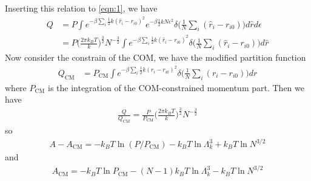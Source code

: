 \documentclass[aps,pre,a4paper,showkeys,fleqn]{revtex4}
\newcommand{\com}[0]{{\textrm{CM}}}
\begin{document}
Inserting this relation to \eqref{eqn:1}, we have
\begin{align}\nonumber
  Q
  & =
    P \int e^{-\beta\sum_i \frac 12k(\hat r_i - r_{i0})^2} e^{-\beta \frac12 kN \epsilon^2} \delta\big( \frac1N \sum_i (\hat r_i - r_{i0}) \big) d\hat r d\epsilon \\
  &=
    P \Big( \frac{2\pi k_BT}k  \Big)^{\frac32} N^{-\frac32}
    \int e^{-\beta\sum_i \frac 12k(\hat r_i - r_{i0})^2} \delta\big( \frac1N \sum_i (\hat r_i - r_{i0}) \big) d\hat r
\end{align}
Now consider the constrain of the COM, we have the modified partition function
\begin{align*}
  Q_\com
  &= 
    {P_\com}
    \int e^{-\beta\sum_i \frac 12k(r_i - r_{i0})^2} \delta\big(\frac1N\sum_i (r_i -  r_{i0})\big) dr 
\end{align*}
where $P_\com$ is the integration of the COM-constrained momentum part.
Then we have
\begin{align}
  \frac{Q}{Q_\com} = \frac{P}{P_\com}\Big( \frac{2\pi k_BT}k  \Big)^{\frac32} N^{-\frac32}
\end{align}
so
\begin{align}
  A - A_\com = -k_BT \ln(P/P_\com) - k_BT \ln \Lambda_k^3 + k_BT \ln N^{3/2} 
\end{align}
and
\begin{align}\label{eqn:5}
  A_\com = -k_BT \ln P_\com - (N-1) k_BT \ln \Lambda_k^3 - k_BT \ln N^{3/2}
\end{align}
\end{document}
